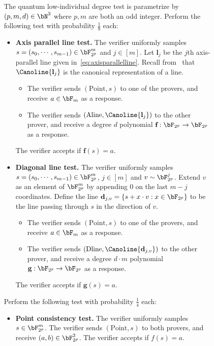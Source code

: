 \begin{figure}[!htbp]
	\centering
	\begin{gamespec}
		\setlength{\tabcolsep}{1em}
		The quantum low-individual degree test is parametrize by $(p, m, d) \in \bN^3$ where $p,m$ are both an odd integer. Perform the following test with probability $\frac{1}{8}$ each:
		\begin{itemize}
			\item \textbf{Axis parallel line test.} The verifier uniformly samples $s = (s_0, \cdots, s_{m-1}) \in \bF_{2^p}^m$ and $j \in [m]$. Let $\textbf{l}_j$ be the $j$th axis-parallel line given in~\eqref{eq:axisparallelline}. Recall from~ that $\Canoline{\textbf{l}_j}$ is the canonical representation of a line. 
			\begin{itemize}
				\item The verifier sends $(\text{Point},s)$ to one of the provers, and receive $a \in \bF_{m}$ as a response.
				\item The verifier sends $(\text{Aline},\Canoline{\textbf{l}_j})$ to the other prover, and receive a degree $d$ polynomial $\textbf{f}: \bF_{2^p} \rightarrow \bF_{2^p}$ as a response.  
			\end{itemize}
			The verifier accepts if $\textbf{f}(s) = a$.
			\item \textbf{Diagonal line test.} The verifier uniformly samples $s = (s_0, \cdots, s_{m-1}) \in \bF_{2^p}^m$, $j \in [m]$ and $v \sim \bF_{2^p}^j$. Extend $v$ as an element of $\bF_{2^p}^m$ by appending $0$ on the last $m-j$ coordinates. Define the line $\textbf{d}_{j,v} = \{s + x \cdot v: x \in \bF_{2^p}\}$ to be the line passing through $s$ in the direction of $v$.  
			\begin{itemize}
				\item The verifier sends $(\text{Point},s)$ to one of the provers, and receive $a \in \bF_{m}$ as a response.
				\item The verifier sends $(\text{Dline},\Canoline{\textbf{d}_{j,v}})$ to the other prover, and receive a degree $d \cdot m$ polynomial $\textbf{g}: \bF_{2^p} \rightarrow \bF_{2^p}$ as a response.  
			\end{itemize}
			The verifier accepts if $\textbf{g}(s) = a$.
		\end{itemize}
		Perform the following test with probability $\frac{1}{4}$ each:
		\begin{itemize}
			\item \textbf{Point consistency test.} The verifier uniformly samples $s \in \bF_{2^p}^m$. The verifier sends $(\text{Point},s)$ to both provers, and receive $(a,b) \in \bF_{2^p}^2$. The verifier accepts if $f(s) = a$.

\end{itemize}
\end{gamespec}
\end{figure}
